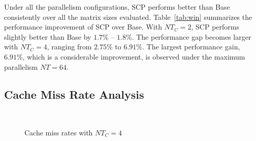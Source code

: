 
Under all the parallelism configurations, 
SCP performs better than Base
consistently over all the matrix sizes evaluated.
Table~\ref{tab:win} summarizes the performance improvement of SCP over Base.
With $NT_C=2$, SCP performs slightly better than Base
by $1.7\%$ -- $1.8\%$.
The performance gap becomes larger with $NT_C=4$,
ranging from $2.75\%$ to $6.91\%$.
The largest performance gain, $6.91\%$, which is a considerable improvement,
is observed under the maximum parallelism $NT=64$.



\subsection{Cache Miss Rate Analysis}\label{subsec:analysis}

\begin{figure}
  \centering
  \\
  \caption{Cache miss rates with $NT_C=4$}
  \label{fig:papi}
\end{figure}


